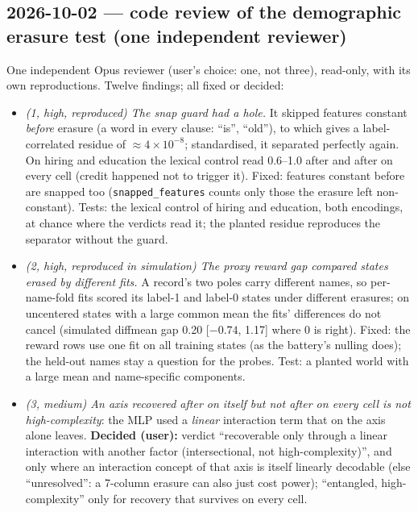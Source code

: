 \documentclass{article}
\begin{document}
\subsection*{2026-10-02 --- code review of the demographic erasure test (one independent reviewer)}
One independent Opus reviewer (user's choice: one, not three), read-only, with its own reproductions. Twelve
findings; all fixed or decided:
\begin{itemize}
  \item \emph{(1, high, reproduced) The snap guard had a hole.} It skipped features constant \emph{before} erasure
        (a word in every clause: ``is'', ``old''), to which \leace{} gives a label-correlated residue of
        $\approx4\times10^{-8}$; standardised, it separated perfectly again. On hiring and education the lexical
        control read 0.6--1.0 after \leace{} and after \leace{} on every cell (credit happened not to trigger it).
        Fixed: features constant before are snapped too (\texttt{snapped\_features} counts only those the erasure
        left non-constant). Tests: the lexical control of hiring and education, both encodings, at chance where the
        verdicts read it; the planted residue reproduces the separator without the guard.
  \item \emph{(2, high, reproduced in simulation) The proxy reward gap compared states erased by different fits.} A
        record's two poles carry different names, so per-name-fold fits scored its label-1 and label-0 states under
        different erasures; on uncentered states with a large common mean the fits' differences do not cancel
        (simulated diffmean gap 0.20 [$-0.74$, 1.17] where 0 is right). Fixed: the reward rows use one fit on all
        training states (as the battery's nulling does); the held-out names stay a question for the probes. Test: a
        planted world with a large mean and name-specific components.
  \item \emph{(3, medium) An axis recovered after \leace{} on itself but not after \leace{} on every cell is not
        high-complexity}: the MLP used a \emph{linear} interaction term that \leace{} on the axis alone leaves.
        \textbf{Decided (user):} verdict ``recoverable only through a linear interaction with another factor
        (intersectional, not high-complexity)'', and only where an interaction concept of that axis is itself linearly
        decodable (else ``unresolved'': a 7-column erasure can also just cost power); ``entangled, high-complexity''
        only for recovery that survives \leace{} on every cell.

\end{itemize}
\end{document}
